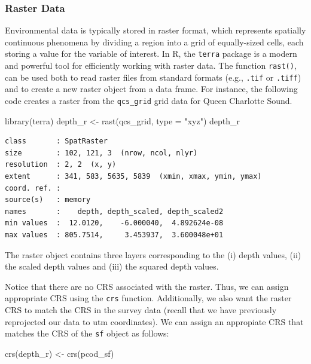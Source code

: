 \documentclass[
  letterpaper,
  DIV=11,
  numbers=noendperiod]{scrartcl}
\newenvironment{Shaded}{\begin{snugshade}}{\end{snugshade}}
\newcommand{\AttributeTok}[1]{\textcolor[rgb]{0.40,0.45,0.13}{#1}}
\newcommand{\FunctionTok}[1]{\textcolor[rgb]{0.28,0.35,0.67}{#1}}
\newcommand{\NormalTok}[1]{\textcolor[rgb]{0.00,0.23,0.31}{#1}}
\newcommand{\OtherTok}[1]{\textcolor[rgb]{0.00,0.23,0.31}{#1}}
\newcommand{\StringTok}[1]{\textcolor[rgb]{0.13,0.47,0.30}{#1}}
\begin{document}
\subsubsection{Raster Data}\label{raster-data}

Environmental data is typically stored in raster format, which
represents spatially continuous phenomena by dividing a region into a
grid of equally-sized cells, each storing a value for the variable of
interest. In R, the \texttt{terra} package is a modern and powerful tool
for efficiently working with raster data. The function \texttt{rast()},
can be used both to read raster files from standard formats (e.g.,
\texttt{.tif} or \texttt{.tiff}) and to create a new raster object from
a data frame. For instance, the following code creates a raster from the
\texttt{qcs\_grid} grid data for Queen Charlotte Sound.

\begin{Shaded}
\begin{Highlighting}[]
\FunctionTok{library}\NormalTok{(terra)}
\NormalTok{depth\_r }\OtherTok{\textless{}{-}} \FunctionTok{rast}\NormalTok{(qcs\_grid, }\AttributeTok{type =} \StringTok{"xyz"}\NormalTok{)}
\NormalTok{depth\_r}
\end{Highlighting}
\end{Shaded}

\begin{verbatim}
class       : SpatRaster 
size        : 102, 121, 3  (nrow, ncol, nlyr)
resolution  : 2, 2  (x, y)
extent      : 341, 583, 5635, 5839  (xmin, xmax, ymin, ymax)
coord. ref. :  
source(s)   : memory
names       :    depth, depth_scaled, depth_scaled2 
min values  :  12.0120,    -6.000040,  4.892624e-08 
max values  : 805.7514,     3.453937,  3.600048e+01 
\end{verbatim}

The raster object contains three layers corresponding to the (i) depth
values, (ii) the scaled depth values and (iii) the squared depth values.

Notice that there are no CRS associated with the raster. Thus, we can
assign appropriate CRS using the \texttt{crs} function. Additionally, we
also want the raster CRS to match the CRS in the survey data (recall
that we have previously reprojected our data to utm coordinates). We can
assign an appropiate CRS that matches the CRS of the \texttt{sf} object
as follows:

\begin{Shaded}
\begin{Highlighting}[]
\FunctionTok{crs}\NormalTok{(depth\_r) }\OtherTok{\textless{}{-}} \FunctionTok{crs}\NormalTok{(pcod\_sf)}
\end{Highlighting}
\end{Shaded}
\end{document}
